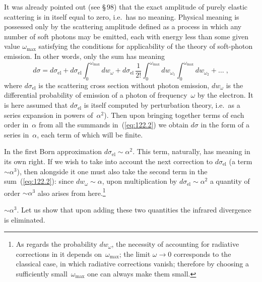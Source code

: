 It was already pointed out (see \S\,98) that the exact amplitude of purely elastic scattering is in itself equal to zero, i.e.\ has no meaning. Physical meaning is possessed only by the scattering amplitude defined as a process in which any number of soft photons may be emitted, each with energy less than some given value $\omega_{\max}$ satisfying the conditions for applicability of the theory of soft-photon emission. In other words, only the sum has meaning
\begin{equation}
d\sigma = d\sigma_{\text{el}} + d\sigma_{\text{el}}\int_0^{\omega_{\max}}dw_\omega + d\sigma_{\text{el}}\,\frac{1}{2!}\int_0^{\omega_{\max}}dw_{\omega_1}\int_0^{\omega_{\max}}dw_{\omega_2} + \ldots\;,
\label{eq:122.2}
\end{equation}
where $d\sigma_{\text{el}}$ is the scattering cross section without photon emission, $dw_\omega$ is the differential probability of emission of a photon of frequency~$\omega$ by the electron. It is here assumed that $d\sigma_{\text{el}}$ is itself computed by perturbation theory, i.e.\ as a series expansion in powers of~$\alpha^2$). Then upon bringing together terms of each order in~$\alpha$ from all the summands in~(\ref{eq:122.2}) we obtain $d\sigma$ in the form of a series in~$\alpha$, each term of which will be finite.

In the first Born approximation $d\sigma_{\text{el}} \sim \alpha^2$. This term, naturally, has meaning in its own right. If we wish to take into account the next correction to $d\sigma_{\text{el}}$ (a term $\sim\alpha^3$), then alongside it one must also take the second term in the sum~(\ref{eq:122.2}): since $dw_\omega \sim \alpha$, upon multiplication by $d\sigma_{\text{el}} \sim \alpha^2$ a quantity of order $\sim\alpha^3$ also arises from here.\footnote{As regards the probability $dw_\omega$, the necessity of accounting for radiative corrections in it depends on~$\omega_{\max}$; the limit $\omega\to 0$ corresponds to the classical case, in which radiative corrections vanish; therefore by choosing a sufficiently small~$\omega_{\max}$ one can always make them small.}


$\sim\alpha^3$. Let us show that upon adding these two quantities the infrared divergence is eliminated.

